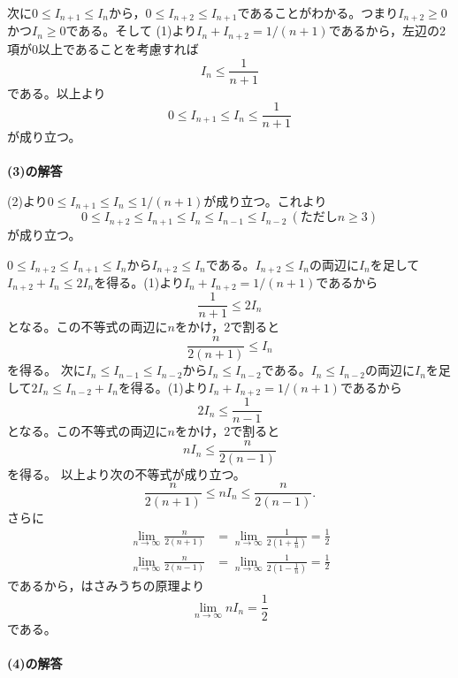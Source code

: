 \documentclass[11pt,a4paper]{jsarticle}
\begin{document}
次に$0\leq I_{n+1}\leq I_{n}$から，$0\leq I_{n+2}\leq I_{n+1}$であることがわかる。つまり$I_{n+2}\geq 0$かつ$I_{n}\geq 0$である。そして (1)より$I_{n}+I_{n+2}=1/(n+1)$であるから，左辺の2項が0以上であることを考慮すれば
\[I_{n} \leq \frac{1}{n+1}\]
である。以上より
\[0 \leq I_{n+1} \leq I_{n} \leq \frac{1}{n+1}\]
が成り立つ。
\\
\\
{\bf (3)の解答}

(2)より$0 \leq I_{n+1} \leq I_{n} \leq 1/(n+1)$が成り立つ。これより
\[0 \leq I_{n+2} \leq I_{n+1} \leq I_{n} \leq I_{n-1} \leq I_{n-2} \ (ただしn\geq 3)\]
が成り立つ。

$0 \leq I_{n+2} \leq I_{n+1} \leq I_{n}$から$I_{n+2}\leq I_{n}$である。$I_{n+2}\leq I_{n}$の両辺に$I_{n}$を足して$I_{n+2}+I_{n}\leq 2I_{n}$を得る。(1)より$I_{n}+I_{n+2}=1/(n+1)$であるから
\[\frac{1}{n+1} \leq 2 I_{n}\]
となる。この不等式の両辺に$n$をかけ，2で割ると
\[\frac{n}{2(n+1)} \leq I_{n}\]
を得る。
次に$I_{n} \leq I_{n-1} \leq I_{n-2}$から$I_{n}\leq I_{n-2}$である。$I_{n}\leq I_{n-2}$の両辺に$I_{n}$を足して$2I_{n}\leq I_{n-2}+I_{n}$を得る。(1)より$I_{n}+I_{n+2}=1/(n+1)$であるから
\[2 I_{n} \leq \frac{1}{n-1}\]
となる。この不等式の両辺に$n$をかけ，2で割ると
\[n I_{n} \leq \frac{n}{2(n-1)}\]
を得る。
以上より次の不等式が成り立つ。
\[\frac{n}{2(n+1)} \leq n I_{n} \leq \frac{n}{2(n-1)}.\]
さらに
\[\begin{aligned}
  \lim _{n \rightarrow \infty} \frac{n}{2(n+1)} &=\lim _{n \rightarrow \infty} \frac{1}{2\left(1+\frac{1}{n}\right)}=\frac{1}{2} \\
  \lim _{n \rightarrow \infty} \frac{n}{2(n-1)} &=\lim _{n \rightarrow \infty} \frac{1}{2\left(1-\frac{1}{n}\right)}=\frac{1}{2}
\end{aligned}\]
であるから，はさみうちの原理より
\[\lim _{n \rightarrow \infty} n I_{n}=\frac{1}{2}\]
である。
\\
\\
{\bf (4)の解答}
\end{document}

